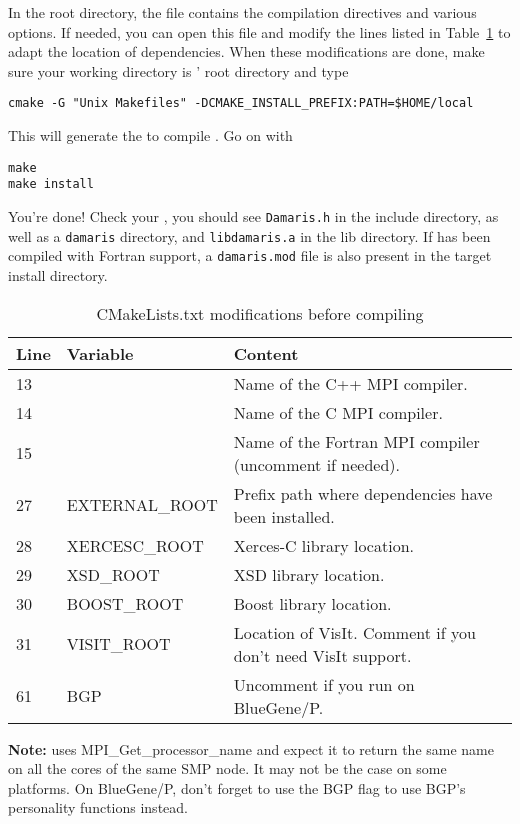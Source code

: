 In the \Damaris{} root directory, the  file contains the 
compilation directives and various options. 
If needed, you can open this file and modify the lines listed in 
Table~\ref{tab:cmake} to adapt the location of dependencies.
When these modifications are done, make sure your working directory is \Damaris' root 
directory and type
\begin{verbatim}
cmake -G "Unix Makefiles" -DCMAKE_INSTALL_PREFIX:PATH=$HOME/local
\end{verbatim}
This will generate the  to compile \Damaris. Go on with 
\begin{verbatim}
make
make install
\end{verbatim}
You're done! Check your \installdir, you should see \texttt{Damaris.h} in the 
include directory, as well as a \texttt{damaris} directory,
and \texttt{libdamaris.a} in the lib directory. If \Damaris{} has been compiled 
with Fortran support, a \texttt{damaris.mod} file is also present in 
the target install directory.

\begin{table}
\centering
\begin{tabular}{|l|l|l|}
	\hline
   Line & Variable & Content \\
   \hline
   \hline
   13 &  & Name of the C++ MPI compiler. \\
   14 &  & Name of the C MPI compiler. \\
   15 &  & Name of the Fortran MPI compiler (uncomment if needed). \\
   27 & EXTERNAL\_ROOT & Prefix path where dependencies have been installed. \\
   28 & XERCESC\_ROOT & Xerces-C library location. \\
   29 & XSD\_ROOT & XSD library location. \\
   30 & BOOST\_ROOT & Boost library location. \\
   31 & VISIT\_ROOT & Location of VisIt. Comment if you don't need VisIt support. \\
   61 & BGP & Uncomment if you run on BlueGene/P. \\
   \hline
\end{tabular}\caption{CMakeLists.txt modifications before compiling \Damaris{}}\label{tab:cmake}
\end{table}

\vspace{0.5cm}

\noindent\textbf{Note:} \Damaris{} uses MPI\_Get\_processor\_name and expect it to return the same
name on all the cores of the same SMP node. It may not be the case on some platforms. 
On BlueGene/P, don't forget to use the BGP flag to use BGP's personality functions instead.